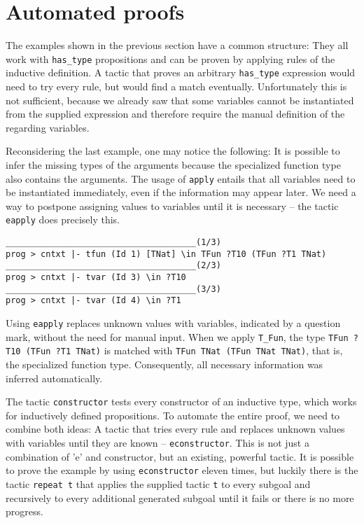 \documentclass[fleqn]{scrreprt}
\newcommand{\coqinline}[1]{\texttt{#1}}
\begin{document}
\section{Automated proofs}
The examples shown in the previous section have a common structure: They all work with \coqinline{has_type} propositions and can be proven by applying rules of the inductive definition. A tactic that proves an arbitrary \coqinline{has_type} expression would need to try every rule, but would find a match eventually. Unfortunately this is not sufficient, because we already saw that some variables cannot be instantiated from the supplied expression and therefore require the manual definition of the regarding variables.
\par
Reconsidering the last example, one may notice the following: It is possible to infer the missing types of the arguments because the specialized function type also contains the arguments. The usage of \coqinline{apply} entails that all variables need to be instantiated immediately, even if the information may appear later. We need a way to postpone assigning values to variables until it is necessary -- the tactic \coqinline{eapply} does precisely this. 
\begin{verbatim}
______________________________________(1/3)
prog > cntxt |- tfun (Id 1) [TNat] \in TFun ?T10 (TFun ?T1 TNat)
______________________________________(2/3)
prog > cntxt |- tvar (Id 3) \in ?T10
______________________________________(3/3)
prog > cntxt |- tvar (Id 4) \in ?T1
\end{verbatim}
Using \coqinline{eapply} replaces unknown values with variables, indicated by a question mark, without the need for manual input. When we apply \coqinline{T_Fun}, the type \coqinline{TFun ?T10 (TFun ?T1 TNat)} is matched with \coqinline{TFun TNat (TFun TNat TNat)}, that is, the specialized function type. Consequently, all necessary information was inferred automatically.
\par
The tactic \coqinline{constructor} tests every constructor of an inductive type, which works for inductively defined propositions. To automate the entire proof, we need to combine both ideas: A tactic that tries every rule and replaces unknown values with variables until they are known -- \coqinline{econstructor}. This is not just a combination of 'e' and constructor, but an existing, powerful tactic. It is possible to prove the example by using \coqinline{econstructor} eleven times, but luckily there is the tactic \coqinline{repeat t} that applies the supplied tactic \coqinline{t} to every subgoal and recursively to every additional generated subgoal until it fails or there is no more progress.
\end{document}
